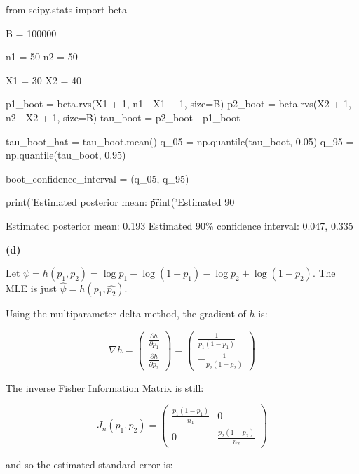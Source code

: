 \begin{python}
from scipy.stats import beta

B = 100000

n1 = 50
n2 = 50

X1 = 30
X2 = 40

p1_boot = beta.rvs(X1 + 1, n1 - X1 + 1, size=B)
p2_boot = beta.rvs(X2 + 1, n2 - X2 + 1, size=B)
tau_boot = p2_boot - p1_boot

tau_boot_hat = tau_boot.mean()
q_05 = np.quantile(tau_boot, 0.05)
q_95 = np.quantile(tau_boot, 0.95)

boot_confidence_interval = (q_05, q_95)

print('Estimated posterior mean: \t\t %
print('Estimated 90%
\end{python}

\begin{console}
Estimated posterior mean:                0.193
Estimated 90\% confidence interval:       0.047, 0.335
\end{console}

\textbf{(d)}

Let
\(\psi = h(p_1, p_2) = \log p_1 - \log (1 - p_1) - \log p_2 + \log (1 - p_2)\).
The MLE is just \(\hat{\psi} = h(\hat{p_1}, \hat{p_2})\).

Using the multiparameter delta method, the gradient of \(h\) is:

\[\nabla h = 
\begin{pmatrix}
\frac{\partial h}{\partial p_1} \\ 
\frac{\partial h}{\partial p_2} \end{pmatrix}
= \begin{pmatrix}
\frac{1}{p_1(1 - p_1)} \\
-\frac{1}{p_2(1 - p_2)}
\end{pmatrix}
\]

The inverse Fisher Information Matrix is still:

\[J_n(p_1, p_2) = \begin{pmatrix}
\frac{p_1(1 - p_1)}{n_1} & 0 \\
0 & \frac{p_2(1 - p_2)}{n_2}
\end{pmatrix}\]

and so the estimated standard error is:

